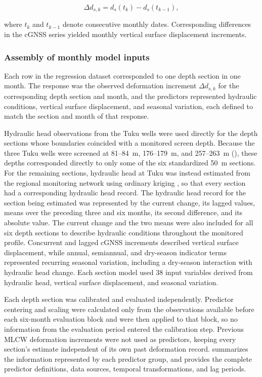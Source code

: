\begin{equation}
\Delta d_{s,k}
=
d_s(t_k)-d_s(t_{k-1}),
\label{eq:monthly_deformation_increment}
\end{equation}

\noindent where $t_k$ and $t_{k-1}$ denote consecutive monthly dates. Corresponding differences in the cGNSS series yielded monthly vertical surface displacement increments.

\subsubsection{Assembly of monthly model inputs}

Each row in the regression dataset corresponded to one depth section in one month. The response was the observed deformation increment $\Delta d_{s,k}$ for the corresponding depth section and month, and the predictors represented hydraulic conditions, vertical surface displacement, and seasonal variation, each defined to match the section and month of that response.

Hydraulic head observations from the Tuku wells were used directly for the depth sections whose boundaries coincided with a monitored screen depth. Because the three Tuku wells were screened at 81--84~m, 176--179~m, and 257--263~m (), these depths corresponded directly to only some of the six standardized 50~m sections. For the remaining sections, hydraulic head at Tuku was instead estimated from the regional monitoring network using ordinary kriging \citep{theodossiou2006}, so that every section had a corresponding hydraulic head record. The hydraulic head record for the section being estimated was represented by the current change, its lagged values, means over the preceding three and six months, its second difference, and its absolute value. The current change and the two means were also included for all six depth sections to describe hydraulic conditions throughout the monitored profile. Concurrent and lagged cGNSS increments described vertical surface displacement, while annual, semiannual, and dry-season indicator terms represented recurring seasonal variation, including a dry-season interaction with hydraulic head change. Each section model used 38 input variables derived from hydraulic head, vertical surface displacement, and seasonal variation.

Each depth section was calibrated and evaluated independently. Predictor centering and scaling were calculated only from the observations available before each six-month evaluation block and were then applied to that block, so no information from the evaluation period entered the calibration step. Previous MLCW deformation increments were not used as predictors, keeping every section's estimate independent of its own past deformation record.  summarizes the information represented by each predictor group, and  provides the complete predictor definitions, data sources, temporal transformations, and lag periods.

